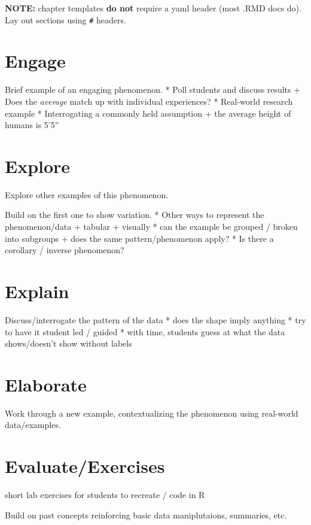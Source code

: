 \documentclass[
]{book}
\begin{document}
\textbf{NOTE:} chapter templates \textbf{do not} require a yaml header (most .RMD docs do). Lay out sections using \texttt{\#} headers.

\hypertarget{engage-1}{%
\chapter{Engage}\label{engage-1}}

Brief example of an engaging phenomenon.
* Poll students and discuss results
+ Does the \emph{average} match up with individual experiences?
* Real-world research example
* Interrogating a commonly held assumption
+ the average height of humans is 5'5''

\hypertarget{explore-1}{%
\chapter{Explore}\label{explore-1}}

Explore other examples of this phenomenon.

Build on the first one to show variation.
* Other ways to represent the phenomenon/data
+ tabular
+ visually
* can the example be grouped / broken into subgroups
+ does the same pattern/phenomenon apply?
* Is there a corollary / inverse phenomenon?

\hypertarget{explain-1}{%
\chapter{Explain}\label{explain-1}}

Discuss/interrogate the pattern of the data
* does the shape imply anything
* try to have it student led / guided
* with time, students guess at what the data shows/doesn't show without labels

\hypertarget{elaborate-1}{%
\chapter{Elaborate}\label{elaborate-1}}

Work through a new example, contextualizing the phenomenon using real-world data/examples.

\hypertarget{evaluateexercises-1}{%
\chapter{Evaluate/Exercises}\label{evaluateexercises-1}}

short lab exercises for students to recreate / code in R

Build on past concepts reinforcing basic data maniplutaions, summaries, etc.

  
\end{document}
